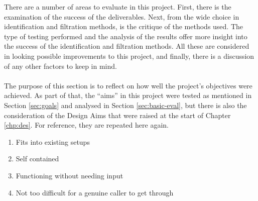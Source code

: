 \documentclass[main.tex]{subfiles}
\begin{document}
There are a number of areas to evaluate in this project. First, there is the examination of the success of the deliverables. Next, from the wide choice in identification and filtration methods, is the critique of the methods used. The type of testing performed and the analysis of the results offer more insight into the success of the identification and filtration methods. All these are considered in looking possible improvements to this project, and finally, there is a discussion of any other factors to keep in mind.
\\\\
The purpose of this section is to reflect on how well the project's objectives were achieved. As part of that, the ``aims'' in this project were tested as mentioned in Section \ref{sec:goals} and analysed in Section \ref{sec:basic-eval}, but there is also the consideration of the Design Aims that were raised at the start of Chapter \ref{chp:des}. For reference, they are repeated here again.

\begin{enumerate}
	\item Fits into existing setups
	\item Self contained
	\item Functioning without needing input
	\item Not too difficult for a genuine caller to get through
\end{enumerate}
\end{document}
